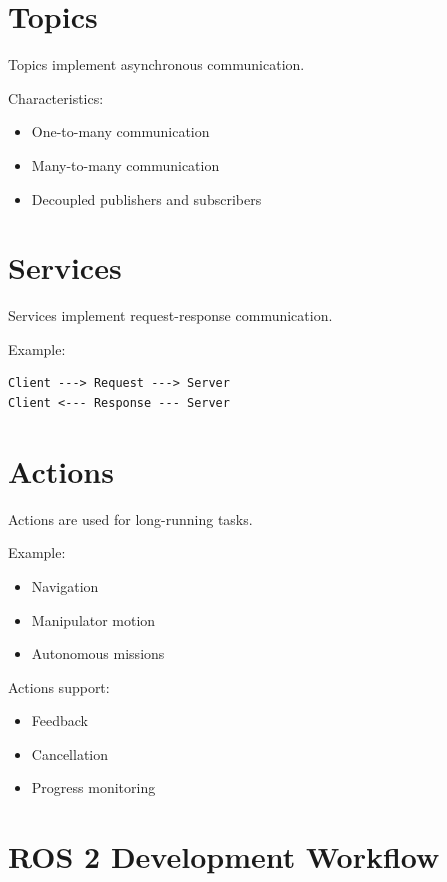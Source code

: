 \documentclass[11pt]{article}
\begin{document}
\section{Topics}

Topics implement asynchronous communication.

Characteristics:

\begin{itemize}
\item One-to-many communication
\item Many-to-many communication
\item Decoupled publishers and subscribers
\end{itemize}

\section{Services}

Services implement request-response communication.

Example:

\begin{verbatim}
Client ---> Request ---> Server
Client <--- Response --- Server
\end{verbatim}

\section{Actions}

Actions are used for long-running tasks.

Example:

\begin{itemize}
\item Navigation
\item Manipulator motion
\item Autonomous missions
\end{itemize}

Actions support:

\begin{itemize}
\item Feedback
\item Cancellation
\item Progress monitoring
\end{itemize}

\section{ROS 2 Development Workflow}
\end{document}
